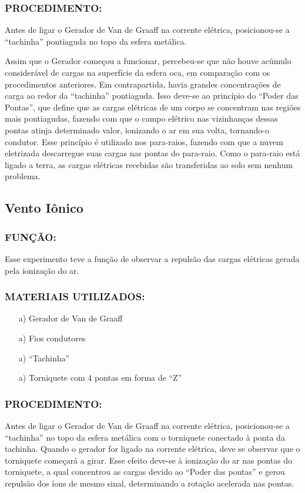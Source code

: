 \subsubsection{PROCEDIMENTO:}
Antes de ligar o Gerador de Van de Graaff na corrente elétrica, posicionou-se a “tachinha”
pontiaguda no topo da esfera metálica.

\noindent Assim que o Gerador começou a funcionar, percebeu-se que não houve acúmulo considerável de 
cargas na superfície da esfera oca, em comparação com os procedimentos anteriores.
Em contrapartida, havia grandes concentrações de carga ao redor da “tachinha” pontiaguda. Isso 
deve-se ao princípio do “Poder das Pontas”, que define que as cargas elétricas de um corpo se
concentram nas regiões mais pontiagudas, fazendo com que o campo elétrico nas vizinhanças 
dessas pontas atinja determinado valor, ionizando o ar em sua volta, tornando-o condutor.
Esse princípio é utilizado nos para-raios, fazendo com que a nuvem eletrizada descarregue suas 
cargas nas pontas do para-raio. Como o para-raio está ligado a terra, as cargas elétricas recebidas 
são transferidas ao solo sem nenhum problema. 

\subsection{Vento Iônico}
\subsubsection{FUNÇÃO:}
Esse experimento teve a função de observar a repulsão das cargas elétricas gerada pela ionização 
do ar.
\subsubsection{MATERIAIS UTILIZADOS: }
\begin{itemize}
    \item[a)] Gerador de Van de Graaff
    \item[a)] Fios condutores
    \item[a)] “Tachinha”
    \item[a)] Torniquete com 4 pontas em forma de “Z”
    \end{itemize}
    
\subsubsection{PROCEDIMENTO: }
Antes de ligar o Gerador de Van de Graaff na corrente elétrica, posicionou-se a “tachinha” no topo 
da esfera metálica com o torniquete conectado à ponta da tachinha. 
Quando o gerador for ligado na corrente elétrica, deve se observar que o torniquete começará a girar. 
Esse efeito deve-se à ionização do ar nas pontas do torniquete, a qual concentrou as cargas 
devido ao “Poder das pontas” e gerou repulsão dos íons de mesmo sinal, determinando a rotação 
acelerada nas pontas. 


